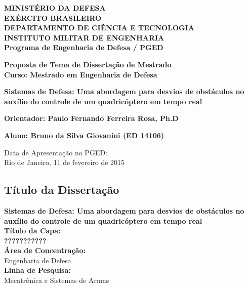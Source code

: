 \documentclass[a4paper, 12pt]{article}
\author{Seu nome}
\title{}
\begin{document}
\begin{center}
\textbf{MINISTÉRIO DA DEFESA}\\
\textbf{EXÉRCITO BRASILEIRO}\\
\textbf{DEPARTAMENTO DE CIÊNCIA E TECNOLOGIA}\\
\textbf{INSTITUTO MILITAR DE ENGENHARIA}\\
\textbf{Programa de Engenharia de Defesa / PGED}

\vspace{2.5cm}

\begin{large}
\textbf{Proposta de Tema de Dissertação de Mestrado
\\Curso: Mestrado em Engenharia de Defesa}

\vspace{1.5cm}

\textbf{Sistemas de Defesa: Uma abordagem para desvios de obstáculos no auxílio do controle de um quadricóptero em tempo real}

\vspace{1.5cm}


\textbf{Orientador: Paulo Fernando Ferreira Rosa, Ph.D}

\end{large}

\vspace{1.5cm}

\textbf{Aluno: Bruno da Silva Giovanini (ED 14106)}


\vspace{2cm}

\begin{small}
Data de Apresentação no PGED:\\
Rio de Janeiro, 11 de fevereiro de 2015
\end{small}

\end{center}


\newpage
\begin{large}
\section*{Título da Dissertação}

\textbf{Sistemas de Defesa: Uma abordagem para desvios de obstáculos no auxílio do controle de um quadricóptero em tempo real}\\

\noindent\textbf{Título da Capa:}\\
\textbf{???????????}\\

\noindent\textbf{Área de Concentração:}\\
Engenharia de Defesa\\

\noindent\textbf{Linha de Pesquisa:}\\
Mecatrônica e Sistemas de Armas\\
\end{large}
\end{document}
